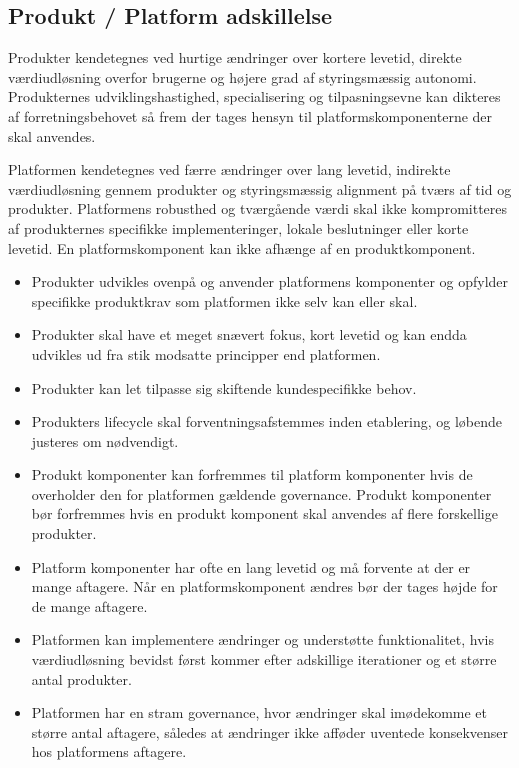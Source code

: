 \documentclass{article}
\begin{document}
\subsection{Produkt / Platform adskillelse}
Produkter kendetegnes ved hurtige ændringer over kortere levetid, direkte værdiudløsning overfor brugerne og højere grad af styringsmæssig autonomi. 
Produkternes udviklingshastighed, specialisering og tilpasningsevne kan dikteres af forretningsbehovet så frem der tages hensyn til platformskomponenterne der skal anvendes. 

Platformen kendetegnes ved færre ændringer over lang levetid, indirekte værdiudløsning gennem produkter og styringsmæssig alignment på tværs af tid og produkter. Platformens robusthed og tværgående værdi skal ikke kompromitteres af produkternes specifikke implementeringer, lokale beslutninger eller korte levetid. En platformskomponent kan ikke afhænge af en produktkomponent.

\begin{itemize}
\item Produkter udvikles ovenpå og anvender platformens komponenter og opfylder specifikke produktkrav som platformen ikke selv kan eller skal.
\item Produkter skal have et meget snævert fokus, kort levetid og kan endda udvikles ud fra stik modsatte principper end platformen.
\item Produkter kan let tilpasse sig skiftende kundespecifikke behov.
\item Produkters lifecycle skal forventningsafstemmes inden etablering, og løbende justeres om nødvendigt.
\item Produkt komponenter kan forfremmes til platform komponenter hvis de overholder den for platformen gældende governance. Produkt komponenter bør forfremmes hvis en produkt komponent skal anvendes af flere forskellige produkter.
\item Platform komponenter har ofte en lang levetid og må forvente at der er mange aftagere. Når en platformskomponent ændres bør der tages højde for de mange aftagere.
\item Platformen kan implementere ændringer og understøtte funktionalitet, hvis værdiudløsning bevidst først kommer efter adskillige iterationer og et større antal produkter.
\item Platformen har en stram governance, hvor ændringer skal imødekomme et større antal aftagere, således at ændringer ikke afføder uventede konsekvenser hos platformens aftagere.
\end{itemize}
\end{document}
